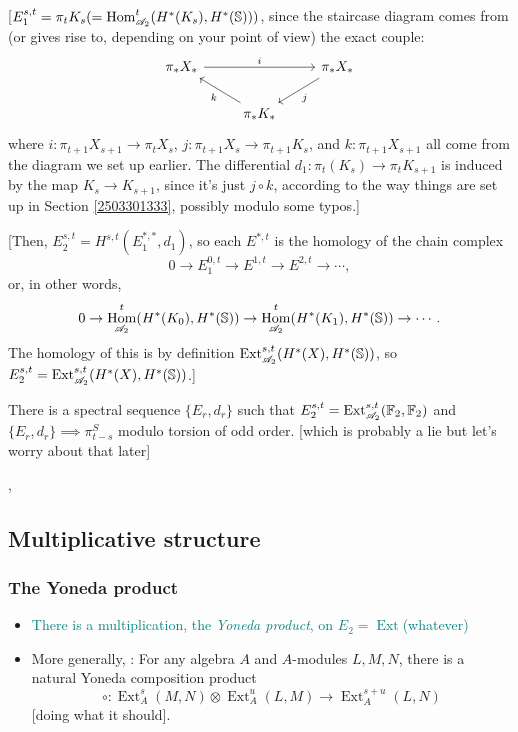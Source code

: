 \documentclass{MetricNotes2023}
\def\bb{\ensuremath\mathbb}
\def\A{\ensuremath{\mathscr{A}_2}}
\DeclareMathOperator{\Ext}{Ext}
\DeclareMathOperator{\Hom}{Hom}
\def\textcolour{\textcolor}
\begin{document}
[\(E_1^{s,t} = \pi_t K_s (=\Hom^t_{\A}(H^*(K_s), H^*(\bb{S})))\), since the staircase diagram comes from (or gives rise to, depending on your point of view) the exact couple:
\[\begin{tikzcd}
 \pi_*X_* \arrow[rr, "i"] & & \pi_* X_* \arrow[dl, "j"] \\ 
 & \pi_*K_* \arrow[ul, "k"] & 
 \end{tikzcd}\]
where \(i : \pi_{t+1}X_{s+1}\to \pi_tX_s\), \(j : \pi_{t+1}X_s \to \pi_{t+1}K_s\), and \(k : \pi_{t+1}X_{s+1}\) all come from the diagram we set up earlier. The differential \(d_1 : \pi_t(K_s)\to\pi_t K_{s+1}\) is induced by the map \(K_s \to K_{s+1}\), since it's just \(j\circ k\), according to the way things are set up in Section \ref{2503301333}, possibly modulo some typos.]

[Then, \(E^{s,t}_2=H^{s,t}(E_1^{*,*}, d_1)\), so each \(E^{*, t}\) is the homology of the chain complex
\[0 \to E^{0,t}_1 \to E^{1,t}\to E^{2,t}\to \cdots,\]
or, in other words,
\[0 \to \Hom^t_{\A}(H^*(K_0), H^*(\bb{S}))\to \Hom^t_{\A}(H^*(K_1), H^*(\bb{S}))\to \cdots.\]
The homology of this is by definition \(\Ext_{\A}^{s,t}(H^*(X), H^*(\bb{S}))\), so \(E_2^{s,t}=\Ext^{s,t}_{\A}(H^*(X), H^*(\bb{S}))\).]

\begin{theorem}
There is a spectral sequence \(\{E_r, d_r\}\) such that \(E_2^{s,t}=\Ext_{\A}^{s,t}(\bb{F}_2, \bb{F}_2)\) and \(\{E_r, d_r\}\implies \pi_{t-s}^S\) modulo torsion of odd order. [which is probably a lie but let's worry about that later]
\end{theorem}



\autocite{spectral_sequences}, \autocite{hatcher5}

\subsection{Multiplicative structure}

\subsubsection{The Yoneda product}

\begin{itemize}
\item \textcolour{teal}{There is a multiplication, the \textit{Yoneda product}, on \(E_2 = \Ext\)(whatever)}
\item More generally, \autocite{rognes2}: For any algebra \(A\) and \(A\)-modules \(L,M,N\), there is a natural Yoneda composition product
\[\circ : \Ext_A^s(M,N)\otimes \Ext^u_A(L,M)\to \Ext_A^{s+u}(L,N)\]
[doing what it should].
\end{itemize}
\end{document}
